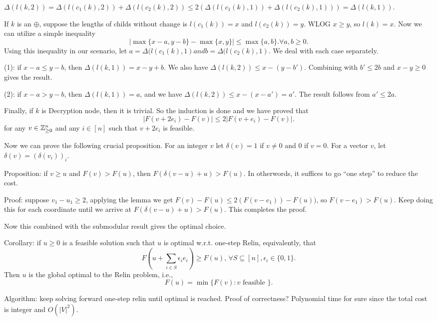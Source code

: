 \documentclass[11pt]{article} %
\theoremstyle{plain}
\theoremstyle{definition}
\begin{document}
$\Delta(l(k, 2))  = \Delta(l(c_1(k), 2)) + \Delta(l(c_2(k), 2)) \leq 2(\Delta(l(c_1(k), 1)) + \Delta(l(c_2(k), 1))) = \Delta(l(k,1))$. 

If $k$ is an $\oplus$, suppose the lengths of childs without change is $l(c_1(k)) = x$ and $l(c_2(k)) = y$.
WLOG $x \geq y$, so $l(k) = x$. Now we can utilize a simple inequality 
\[
	| \max \{ x-a, y - b\} - \max \{x, y\} |  \leq \max \{a, b\}. \forall a,b \geq 0. 
\]
Using this inequality in our scenario, let $a = \Delta(l(c_1(k), 1) and b = \Delta(l(c_2(k), 1)$. We 
deal with each case separately. 

(1): if $x - a \leq y -b$, then $\Delta(l(k,1)) = x - y + b$. We also have $\Delta(l(k,2)) \leq x - (y - b')$. 
Combining with $b' \leq 2b$ and $x - y \geq 0$ gives the result.

(2): if $x-a > y-b$, then $\Delta(l(k,1)) = a$, and we have $\Delta(l(k,2)) \leq x - (x-a') = a'$. The result
follows from $a' \leq 2a$. 


Finally, if $k$ is Decryption node, then it is trivial. So the induction is done and we have proved that 
$$|F(v + 2e_i) - F(v) |  \leq 2 |F(v+e_i) - F(v)|.$$ for any $v \in \mathbb{Z}_{\geq 0}^n$ and any $i \in [n]$ such that $v + 2e_i$ is feasible. 

Now we can prove the following crucial proposition. For an integer $v$ let $\delta(v) = 1$ if $v \neq 0$
and 0 if $v = 0$. For a vector $v$, let $\delta(v) = (\delta(v_i))_i$. 

Proposition: if $v \geq u$ and  $F(v)  > F(u)$, then $F( \delta(v-u) + u) > F(u)$. In otherwords, it suffices 
to go ``one step'' to reduce the cost. 

Proof: suppose $v_1 - u_1 \geq 2$,  applying the lemma we get 
$F(v) - F(u) \leq 2(F(v-e_1)) - F(u))$, so $F(v-e_1) > F(u)$. Keep doing this for each coordinate until we arrive at $F( \delta(v-u) + u) > F(u)$. This completes the proof. 


Now this combined with the submodular result gives the optimal choice. 


Corollary: if $u \geq 0$ is a feasible solution such that $u$ is optimal w.r.t. one-step Relin, equivalently, 
that 
\[
	F(u + \sum_{i \in S} \epsilon_i e_i) \geq F(u), \, \forall S \subseteq [n], \epsilon_i \in \{0, 1\}. 
\] 
Then $u$ is the global optimal to the Relin problem, i.e., 
\[
	F(u) = \min \{ F(v): v \mbox{ feasible } \}.  
\] 

Algorithm: keep solving forward one-step relin until optimal is reached. Proof of correctness? Polynomial 
time for sure since the total cost is integer and $O(|V|^2)$. 
\end{document}

